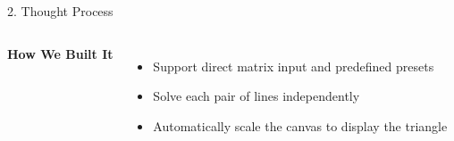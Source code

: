 \documentclass[aspectratio=169,11pt]{beamer}
\begin{document}
\begin{frame}{2. Thought Process}
\begin{columns}[T]

      \textbf{How We Built It}

      \begin{itemize}
        \item Support direct matrix input and predefined presets
        \item Solve each pair of lines independently
        \item Automatically scale the canvas to display the triangle
      \end{itemize}

  \end{columns}

\end{frame}

\end{document}
